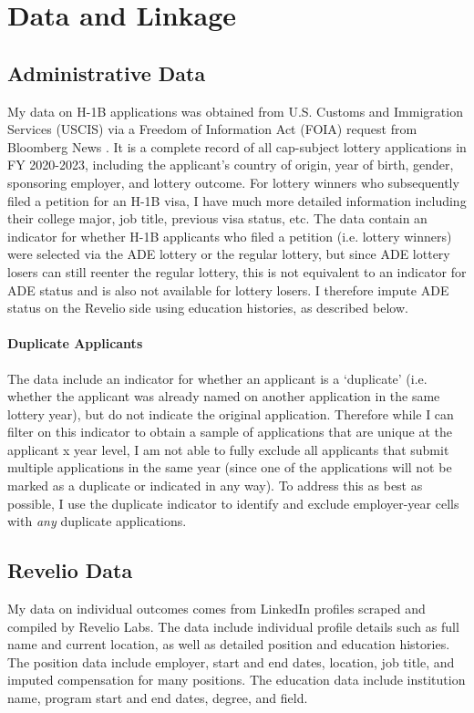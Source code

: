 \section{Data and Linkage}

\label{sec:data}
\subsection{Administrative Data}
My data on H-1B applications was obtained from U.S. Customs and Immigration Services (USCIS) via a Freedom of Information Act (FOIA) request from Bloomberg News \citep{bloomberggraphics_h1b_data_2025}. It is a complete record of all cap-subject lottery applications in FY 2020-2023, including the applicant's country of origin, year of birth, gender, sponsoring employer, and lottery outcome. For lottery winners who subsequently filed a petition for an H-1B visa, I have much more detailed information including their college major, job title, previous visa status, etc. The data contain an indicator for whether H-1B applicants who filed a petition (i.e. lottery winners) were selected via the ADE lottery or the regular lottery, but since ADE lottery losers can still reenter the regular lottery, this is not equivalent to an indicator for ADE status and is also not available for lottery losers. I therefore impute ADE status on the Revelio side using education histories, as described below.

\paragraph{Duplicate Applicants}
The data include an indicator for whether an applicant is a `duplicate' (i.e. whether the applicant was already named on another application in the same lottery year), but do not indicate the original application. Therefore while I can filter on this indicator to obtain a sample of applications that are unique at the applicant x year level, I am not able to fully exclude all applicants that submit multiple applications in the same year (since one of the applications will not be marked as a duplicate or indicated in any way). To address this as best as possible, I use the duplicate indicator to identify and exclude employer-year cells with \textit{any} duplicate applications.


\subsection{Revelio Data}
My data on individual outcomes comes from LinkedIn profiles scraped and compiled by Revelio Labs. The data include individual profile details such as full name and current location, as well as detailed position and education histories. The position data include employer, start and end dates, location, job title, and imputed compensation for many positions. The education data include institution name, program start and end dates, degree, and field.


